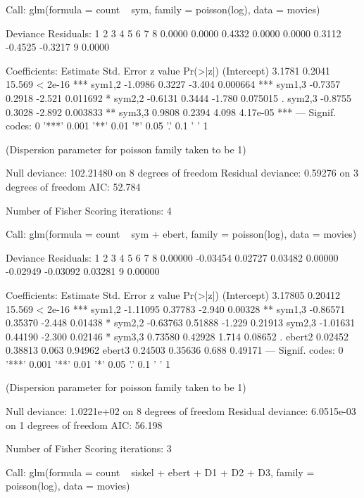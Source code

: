 \documentclass{article}
\begin{document}
\begin{Schunk}
\begin{Soutput}
Call:
glm(formula = count ~ sym, family = poisson(log), data = movies)

Deviance Residuals: 
      1        2        3        4        5        6        7        8  
 0.0000   0.0000   0.4332   0.0000   0.0000   0.3112  -0.4525  -0.3217  
      9  
 0.0000  

Coefficients:
            Estimate Std. Error z value Pr(>|z|)    
(Intercept)   3.1781     0.2041  15.569  < 2e-16 ***
sym1,2       -1.0986     0.3227  -3.404 0.000664 ***
sym1,3       -0.7357     0.2918  -2.521 0.011692 *  
sym2,2       -0.6131     0.3444  -1.780 0.075015 .  
sym2,3       -0.8755     0.3028  -2.892 0.003833 ** 
sym3,3        0.9808     0.2394   4.098 4.17e-05 ***
---
Signif. codes:  0 '***' 0.001 '**' 0.01 '*' 0.05 '.' 0.1 ' ' 1

(Dispersion parameter for poisson family taken to be 1)

    Null deviance: 102.21480  on 8  degrees of freedom
Residual deviance:   0.59276  on 3  degrees of freedom
AIC: 52.784

Number of Fisher Scoring iterations: 4
\end{Soutput}
\begin{Soutput}
Call:
glm(formula = count ~ sym + ebert, family = poisson(log), data = movies)

Deviance Residuals: 
       1         2         3         4         5         6         7         8  
 0.00000  -0.03454   0.02727   0.03482   0.00000  -0.02949  -0.03092   0.03281  
       9  
 0.00000  

Coefficients:
            Estimate Std. Error z value Pr(>|z|)    
(Intercept)  3.17805    0.20412  15.569  < 2e-16 ***
sym1,2      -1.11095    0.37783  -2.940  0.00328 ** 
sym1,3      -0.86571    0.35370  -2.448  0.01438 *  
sym2,2      -0.63763    0.51888  -1.229  0.21913    
sym2,3      -1.01631    0.44190  -2.300  0.02146 *  
sym3,3       0.73580    0.42928   1.714  0.08652 .  
ebert2       0.02452    0.38813   0.063  0.94962    
ebert3       0.24503    0.35636   0.688  0.49171    
---
Signif. codes:  0 '***' 0.001 '**' 0.01 '*' 0.05 '.' 0.1 ' ' 1

(Dispersion parameter for poisson family taken to be 1)

    Null deviance: 1.0221e+02  on 8  degrees of freedom
Residual deviance: 6.0515e-03  on 1  degrees of freedom
AIC: 56.198

Number of Fisher Scoring iterations: 3
\end{Soutput}
\begin{Soutput}
Call:
glm(formula = count ~ siskel + ebert + D1 + D2 + D3, family = poisson(log), 
    data = movies)


\end{Soutput}
\end{Schunk}
\end{document}
